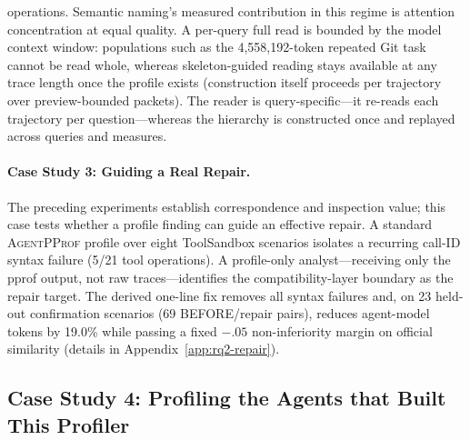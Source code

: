 \documentclass[letterpaper]{article}
\newcommand{\sys}{\textsc{AgentPProf}\xspace}
\begin{document}
operations.
Semantic naming's measured contribution in this regime is attention
concentration at equal quality.
A per-query full read is bounded by the model context window: populations
such as the 4{,}558{,}192-token repeated Git task cannot be read whole,
whereas skeleton-guided reading stays available at any trace length once
the profile exists (construction itself proceeds per trajectory over
preview-bounded packets).
The reader is query-specific---it re-reads each trajectory per
question---whereas the hierarchy is constructed once and replayed across
queries and measures.

\paragraph{Case Study 3: Guiding a Real Repair.}
The preceding experiments establish correspondence and inspection value; this
case tests whether a profile finding can guide an effective repair.
A standard \sys profile over eight ToolSandbox scenarios isolates a recurring
call-ID syntax failure (5/21 tool operations).
A profile-only analyst---receiving only the pprof output, not raw
traces---identifies the compatibility-layer boundary as the repair target.
The derived one-line fix removes all syntax failures and, on 23 held-out
confirmation scenarios (69 BEFORE/repair pairs), reduces agent-model tokens
by 19.0\% while passing a fixed $-.05$ non-inferiority margin on official
similarity (details in Appendix~\ref{app:rq2-repair}).

\subsection{Case Study 4: Profiling the Agents that Built This Profiler}
\end{document}
